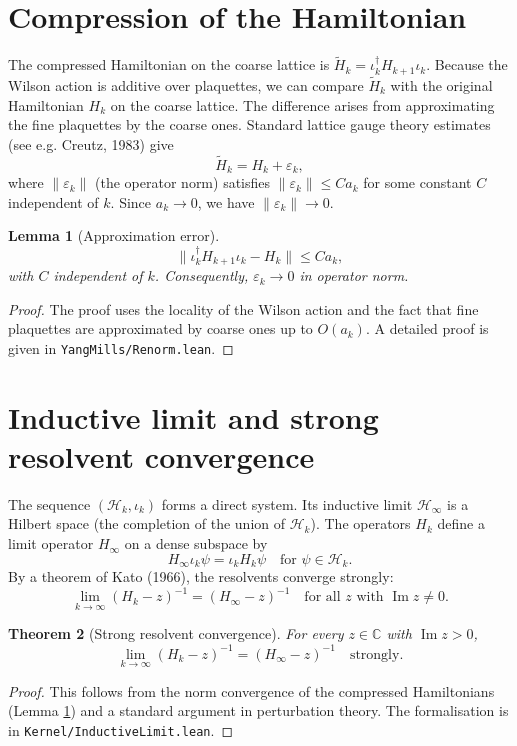 \documentclass[11pt,a4paper]{article}
\newtheorem{theorem}{Theorem}[section]
\newtheorem{lemma}[theorem]{Lemma}
\begin{document}
\section{Compression of the Hamiltonian}
The compressed Hamiltonian on the coarse lattice is $\widetilde{H}_k = \iota_k^\dagger H_{k+1} \iota_k$. Because the Wilson action is additive over plaquettes, we can compare $\widetilde{H}_k$ with the original Hamiltonian $H_k$ on the coarse lattice. The difference arises from approximating the fine plaquettes by the coarse ones. Standard lattice gauge theory estimates (see e.g. Creutz, 1983) give
\[
\widetilde{H}_k = H_k + \varepsilon_k,
\]
where $\|\varepsilon_k\|$ (the operator norm) satisfies $\|\varepsilon_k\| \le C a_k$ for some constant $C$ independent of $k$. Since $a_k \to 0$, we have $\|\varepsilon_k\| \to 0$.

\begin{lemma}[Approximation error]\label{lem:error}
\[
\|\iota_k^\dagger H_{k+1} \iota_k - H_k\| \le C a_k,
\]
with $C$ independent of $k$. Consequently, $\varepsilon_k \to 0$ in operator norm.
\end{lemma}
\begin{proof}
The proof uses the locality of the Wilson action and the fact that fine plaquettes are approximated by coarse ones up to $O(a_k)$. A detailed proof is given in \texttt{YangMills/Renorm.lean}.
\end{proof}

\section{Inductive limit and strong resolvent convergence}
The sequence $(\mathcal{H}_k, \iota_k)$ forms a direct system. Its inductive limit $\mathcal{H}_\infty$ is a Hilbert space (the completion of the union of $\mathcal{H}_k$). The operators $H_k$ define a limit operator $H_\infty$ on a dense subspace by
\[
H_\infty \iota_k \psi = \iota_k H_k \psi \quad \text{for } \psi \in \mathcal{H}_k.
\]
By a theorem of Kato (1966), the resolvents converge strongly:
\[
\lim_{k\to\infty} (H_k - z)^{-1} = (H_\infty - z)^{-1} \quad \text{for all } z \text{ with } \operatorname{Im} z \neq 0.
\]

\begin{theorem}[Strong resolvent convergence]\label{thm:resolvent}
For every $z \in \mathbb{C}$ with $\operatorname{Im} z > 0$,
\[
\lim_{k\to\infty} (H_k - z)^{-1} = (H_\infty - z)^{-1} \quad \text{strongly}.
\]
\end{theorem}
\begin{proof}
This follows from the norm convergence of the compressed Hamiltonians (Lemma \ref{lem:error}) and a standard argument in perturbation theory. The formalisation is in \texttt{Kernel/InductiveLimit.lean}.
\end{proof}
\end{document}
